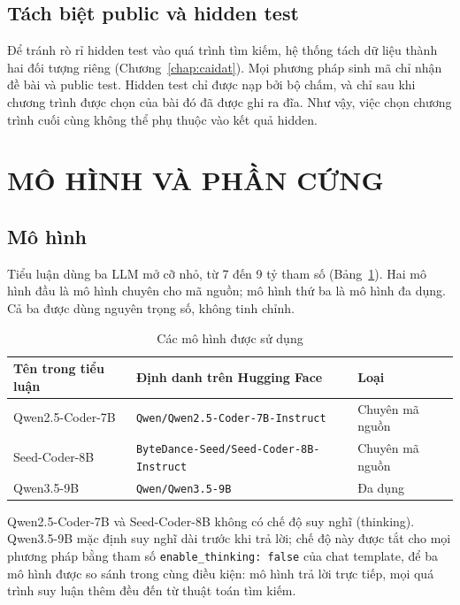 \subsection{Tách biệt public và hidden test}

Để tránh rò rỉ hidden test vào quá trình tìm kiếm, hệ thống tách dữ liệu thành hai đối tượng riêng (Chương~\ref{chap:caidat}). Mọi phương pháp sinh mã chỉ nhận đề bài và public test. Hidden test chỉ được nạp bởi bộ chấm, và chỉ sau khi chương trình được chọn của bài đó đã được ghi ra đĩa. Như vậy, việc chọn chương trình cuối cùng không thể phụ thuộc vào kết quả hidden.

\section{MÔ HÌNH VÀ PHẦN CỨNG}
\label{sec:mohinh}

\subsection{Mô hình}

Tiểu luận dùng ba LLM mở cỡ nhỏ, từ 7 đến 9 tỷ tham số (Bảng~\ref{tab:mohinh}). Hai mô hình đầu là mô hình chuyên cho mã nguồn; mô hình thứ ba là mô hình đa dụng. Cả ba được dùng nguyên trọng số, không tinh chỉnh.

\begin{table}[htbp]
  \caption{Các mô hình được sử dụng}
  \label{tab:mohinh}
  \begin{tabular}{l>{\footnotesize}ll}
    \toprule
    Tên trong tiểu luận & \normalsize Định danh trên Hugging Face & Loại \\
    \midrule
    Qwen2.5-Coder-7B & \texttt{Qwen/Qwen2.5-Coder-7B-Instruct} & Chuyên mã nguồn \\
    Seed-Coder-8B & \texttt{ByteDance-Seed/Seed-Coder-8B-Instruct} & Chuyên mã nguồn \\
    Qwen3.5-9B & \texttt{Qwen/Qwen3.5-9B} & Đa dụng \\
    \bottomrule
  \end{tabular}
\end{table}

Qwen2.5-Coder-7B và Seed-Coder-8B không có chế độ suy nghĩ (thinking). Qwen3.5-9B mặc định suy nghĩ dài trước khi trả lời; chế độ này được tắt cho mọi phương pháp bằng tham số \texttt{enable\_thinking: false} của chat template, để ba mô hình được so sánh trong cùng điều kiện: mô hình trả lời trực tiếp, mọi quá trình suy luận thêm đều đến từ thuật toán tìm kiếm.

